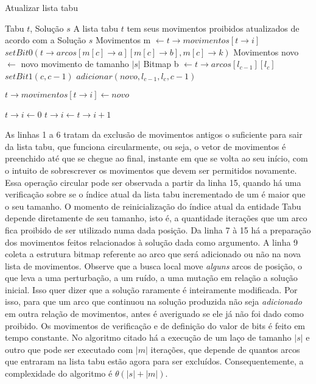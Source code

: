 	\begin{algorithm}[H]
    \caption{Atualizar lista tabu}
    \begin{algorithmic}[1]
    \REQUIRE Tabu $t$, Solução $s$
    \ENSURE A lista tabu $t$ tem seus movimentos proibidos atualizados de acordo com a Solução $s$
    \STATE Movimentos m  $\leftarrow t \rightarrow movimentos[t \rightarrow i]$
			\STATE $setBit0(t \rightarrow arcos [m[c] \rightarrow a][m[c] \rightarrow b], m[c] \rightarrow k)$
		\ENDFOR
    \ENDIF
    \STATE Movimentos novo $\leftarrow$ novo movimento de tamanho $|s|$
		\STATE Bitmap b $\leftarrow t \rightarrow arcos [l_{c-1}][l_c]$
			\STATE $setBit1(c, c-1)$
			\STATE $adicionar(novo, l_{c-1}, l_c, c-1)$
		\ENDIF
    \ENDFOR
    
    \STATE $t \rightarrow movimentos [t \rightarrow i] \leftarrow novo$
    
    	\STATE $t \rightarrow i \leftarrow 0$
    \ELSE
    	\STATE $t \rightarrow i \leftarrow t \rightarrow i + 1$    
    \ENDIF
    \end{algorithmic}
    \end{algorithm}
    
\par As linhas 1 a 6 tratam da exclusão de movimentos antigos o suficiente para sair da lista tabu, que funciona circularmente, ou seja, o vetor de movimentos é preenchido até que se chegue ao final, instante em que se volta ao seu início, com o intuito de sobrescrever os movimentos que devem ser permitidos novamente. Essa operação circular pode ser observada a partir da linha 15, quando há uma verificação sobre se o índice atual da lista tabu incrementado de um é maior que o seu tamanho. O momento de reinicialização do índice atual da entidade Tabu depende diretamente de seu tamanho, isto é, a quantidade iterações que um arco fica proibido de ser utilizado numa dada posição. Da linha 7 à 15 há a preparação dos movimentos feitos relacionados à solução dada como argumento. A linha 9 coleta a estrutura bitmap referente ao arco que será adicionado ou não na nova lista de movimentos. Observe que a busca local move \textit{alguns} arcos de posição, o que leva a uma perturbação, a um ruído, a uma mutação em relação a solução inicial. Isso quer dizer que a solução raramente é inteiramente modificada. Por isso, para que um arco que continuou na solução produzida não seja \textit{adicionado} em outra relação de movimentos, antes é averiguado se ele já não foi dado como proibido. Os movimentos de verificação e de definição do valor de bits é feito em tempo constante. No algoritmo citado há a execução de um laço de tamanho $|s|$ e outro que pode ser executado com $|m|$ iterações, que depende de quantos arcos que entraram na lista tabu estão agora para ser excluídos. Consequentemente, a complexidade do algoritmo é $\theta(|s| + |m|)$.